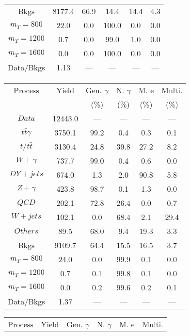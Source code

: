\begin{figure}
\begin{minipage}[c]{0.32\textwidth}
{\begin{tabular}{cccccc}
Bkgs &  8177.4 &  66.9 &  14.4 &  14.4 &  4.3\\
$ m_{T} = 800 $ &  22.0 &  0.0 &  100.0 &  0.0 &  0.0\\
$ m_{T} = 1200 $ &  0.7 &  0.0 &  99.0 &  1.0 &  0.0\\
$ m_{T} = 1600 $ &  0.0 &  0.0 &  100.0 &  0.0 &  0.0\\
Data/Bkgs &  1.13 &  --- &  --- &  --- &  ---\\
\hline
\end{tabular}
}
\end{minipage}
\begin{minipage}[c]{0.32\textwidth}
\centering
\tiny{
\begin{tabular}{cccccc}
\hline
Process & Yield & Gen. $\gamma$ & N. $\gamma$ & M. e & Multi. \\
 &  & (\%) & (\%) & (\%) & (\%)  \\
\hline
                                                                      $ Data $ &  12443.0 &  --- &  --- &  --- &  ---\\
$ t\bar{t}\gamma $ &  3750.1 &  99.2 &  0.4 &  0.3 &  0.1\\
$ t/t\bar{t} $ &  3130.4 &  24.8 &  39.8 &  27.2 &  8.2\\
$ W+\gamma $ &  737.7 &  99.0 &  0.4 &  0.6 &  0.0\\
$ DY+jets $ &  674.0 &  1.3 &  2.0 &  90.8 &  5.8\\
$ Z+\gamma $ &  423.8 &  98.7 &  0.1 &  1.3 &  0.0\\
$ QCD $ &  202.1 &  72.8 &  26.4 &  0.0 &  0.7\\
$ W+jets $ &  102.1 &  0.0 &  68.4 &  2.1 &  29.4\\
$ Others $ &  89.5 &  68.0 &  9.4 &  19.3 &  3.3\\
Bkgs &  9109.7 &  64.4 &  15.5 &  16.5 &  3.7\\
$ m_{T} = 800 $ &  24.0 &  0.0 &  99.9 &  0.1 &  0.0\\
$ m_{T} = 1200 $ &  0.7 &  0.1 &  99.8 &  0.1 &  0.0\\
$ m_{T} = 1600 $ &  0.0 &  0.2 &  99.6 &  0.2 &  0.1\\
Data/Bkgs &  1.37 &  --- &  --- &  --- &  ---\\
\hline
\end{tabular}
}
\end{minipage}
\begin{minipage}[c]{0.32\textwidth}
\centering
\tiny{
\begin{tabular}{cccccc}
\hline
Process & Yield & Gen. $\gamma$ & N. $\gamma$ & M. e & Multi. \\

\end{tabular}}
\end{minipage}
\end{figure}
